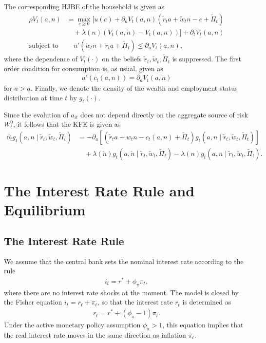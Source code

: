 \documentclass[notitlepage,a4paper,11pt]{report}
\numberwithin{section}{chapter}
\numberwithin{subsection}{section}
\begin{document}
The corresponding HJBE of the household is given as 
\begin{align*}
\rho V_t( a,n) & = \max_{ c \geq 0} \Bigg[ u(c) + \partial_a V_t(a,n) \left( \tilde{r}_{t}  a + \tilde{w}_t n - c + \tilde{\Pi}_t \right) \\
& \quad + \lambda(n) \left( V_t(a, \check{n}) - V_t( a, n) \right)  \Bigg] + \partial_t V_t(a,n) \\[10pt]
\text{subject to} & \quad u'( \tilde{w}_t n + \tilde{r}_t \underline{a} + \tilde{\Pi}_t ) \leq \partial_a V_t(\underline{a}, n), 
\end{align*}
where the dependence of $V_t(\cdot)$ on the beliefs $\tilde{r}_{t}, \tilde{w}_t, \tilde{\Pi}_t$ is suppressed. The first order condition for consumption is, as usual, given as 
\begin{align*}
u'( c_t(a,n)) = \partial_a V_t(a,n) 
\end{align*}
for $a > \underline{a}$. Finally, we denote the density of the wealth and employment status distribution at time $t$ by $g_t(\cdot)$.  


Since the evolution of $a_{it}$ does not depend directly on the aggregate source of risk $W_t^0$, it follows that the KFE is given as 
\begin{align*}
\partial_t g_t( a,n \mid \tilde{r}_t, \tilde{w}_t, \tilde{\Pi}_t ) & = - \partial_a \left[ \left( \tilde{r}_t a + w_t n - c_t(a,n) + \tilde{\Pi}_t\right) g_t(a,n \mid \tilde{r}_t, \tilde{w}_t, \tilde{\Pi}_t )  \right] \\
& \quad + \lambda(\check{n}) g_t( a,\check{n} \mid \tilde{r}_t, \tilde{w}_t, \tilde{\Pi}_t )  - \lambda(n) g_t( a,n \mid \tilde{r}_t, \tilde{w}_t, \tilde{\Pi}_t ). 
\end{align*}




\pagebreak



\section{The Interest Rate Rule and Equilibrium}

\subsection{The Interest Rate Rule}

We assume that the central bank sets the nominal interest rate according to the rule 
\begin{align*}
i_t = r^* + \phi_{\pi} \pi_t, 
\end{align*}
where there are no interest rate shocks at the moment. The model is closed by the Fisher equation $i_t = r_t + \pi_t$, so that the interest rate $r_t$ is determined as 
\begin{align*}
r_t = r^* + (\phi_{\pi} -1 )\pi_t. 
\end{align*}
Under the active monetary policy assumption $\phi_{\pi} >1$, this equation implies that the real interest rate moves in the same direction as inflation $\pi_t$. \\
\end{document}
